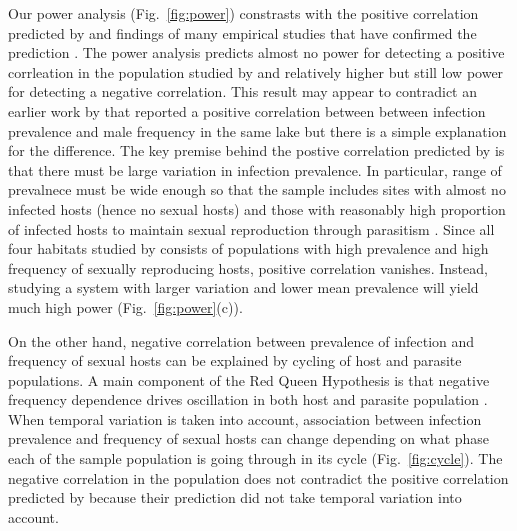 \documentclass{article}\usepackage[]{graphicx}\usepackage[]{color}
\newcommand{\fref}[1]{Fig.~\ref{fig:#1}}
\begin{document}
Our power analysis (\fref{power}) constrasts with the positive correlation predicted by \cite{lively1992parthenogenesis, lively2001trematode} and findings of many empirical studies that have confirmed the prediction \citep{lively1987evidence, lively2002temporal, kumpulainen2004parasites, vergara2013geographic, mckone2016fine}.
The power analysis predicts almost no power for detecting a positive corrleation in the population studied by \cite{vergara2014infection} and relatively higher but still low power for detecting a negative correlation.
This result may appear to contradict an earlier work by \cite{vergara2013geographic} that reported a positive correlation between between infection prevalence and male frequency in the same lake but there is a simple explanation for the difference.
The key premise behind the postive correlation predicted by \cite{lively2001trematode} is that there must be large variation in infection prevalence.
In particular, range of prevalnece must be wide enough so that the sample includes sites with almost no infected hosts (hence no sexual hosts) and those with reasonably high proportion of infected hosts to maintain sexual reproduction through parasitism \citep{lively2001trematode}.
Since all four habitats studied by \cite{vergara2014infection} consists of populations with high prevalence and high frequency of sexually reproducing hosts, positive correlation vanishes.
Instead, studying a system with larger variation and lower mean prevalence will yield much high power (\fref{power}(c)).

On the other hand, negative correlation between prevalence of infection and frequency of sexual hosts can be explained by cycling of host and parasite populations.
A main component of the Red Queen Hypothesis is that negative frequency dependence drives oscillation in both host and parasite population \citep{hamilton1980sex}.
When temporal variation is taken into account, association between infection prevalence and frequency of sexual hosts can change depending on what phase each of the sample population is going through in its cycle (\fref{cycle}).
The negative correlation in the population does not contradict the positive correlation predicted by \cite{lively2001trematode} because their prediction did not take temporal variation into account.
\end{document}
